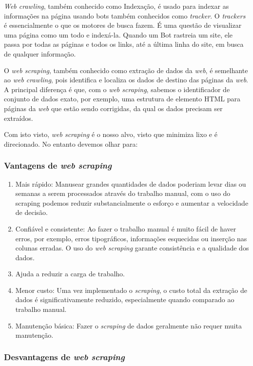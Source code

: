 \documentclass[a4paper,10pt]{article}
\begin{document}
\textit{Web crawling}, também conhecido como Indexação, é usado para indexar as informações na página usando bots também conhecidos como \textit{tracker}.
O \textit{trackers} é essencialmente o que os motores de busca fazem.
É uma questão de visualizar uma página como um todo e indexá-la.
Quando um Bot rastreia um site, ele passa por todas as páginas e todos os links, até a última linha do site, em busca de qualquer informação.

O \textit{web scraping}, também conhecido como extração de dados da \textit{web}, é semelhante ao \textit{web crawling}, pois identifica e localiza os dados de destino das páginas da \textit{web}.
A principal diferença é que, com o \textit{web scraping}, sabemos o identificador de conjunto de dados exato, por exemplo, uma estrutura de elemento HTML para páginas da \textit{web} que estão sendo corrigidas, da qual os dados precisam ser extraídos.

Com isto visto, \textit{web scraping} é o nosso alvo, visto que minimiza lixo e é direcionado.
No entanto devemos olhar para:

\subsubsection{Vantagens de \textit{web scraping}}

\begin{enumerate}
    \item Mais rápido: Manusear grandes quantidades de dados poderiam levar dias ou semanas a serem processados através do trabalho manual, com o uso do scraping podemos reduzir substancialmente o esforço e aumentar a velocidade de decisão.
    \item Confiável e consistente: Ao fazer o trabalho manual é muito fácil de haver erros, por exemplo, erros tipográficos, informações esquecidas ou inserção nas colunas erradas. O uso do \textit{web scraping} garante consistência e a qualidade dos dados.
    \item Ajuda a reduzir a carga de trabalho.
    \item Menor custo: Uma vez implementado o \textit{scraping}, o custo total da extração de dados é significativamente reduzido, especialmente quando comparado ao trabalho manual.
    \item Manutenção básica: Fazer o \textit{scraping} de dados geralmente não requer muita manutenção.
\end{enumerate}

\subsubsection{Desvantagens de \textit{web scraping}}
\end{document}
